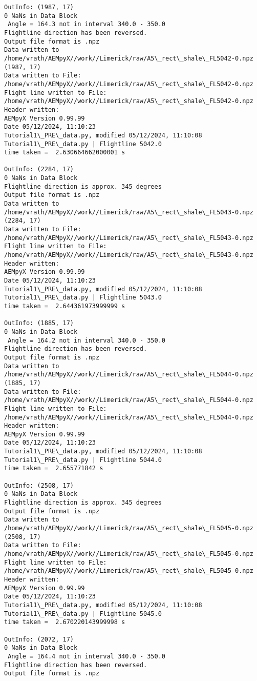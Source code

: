 \documentclass[11pt]{article}
\begin{document}
\begin{Verbatim}[commandchars=\\\{\}]
OutInfo: (1987, 17)
0 NaNs in Data Block
 Angle = 164.3 not in interval 340.0 - 350.0
Flightline direction has been reversed.
Output file format is .npz
Data written to
/home/vrath/AEMpyX//work//Limerick/raw/A5\_rect\_shale\_FL5042-0.npz
(1987, 17)
Data written to File:
/home/vrath/AEMpyX//work//Limerick/raw/A5\_rect\_shale\_FL5042-0.npz
Flight line written to File:
/home/vrath/AEMpyX//work//Limerick/raw/A5\_rect\_shale\_FL5042-0.npz
Header written:
AEMpyX Version 0.99.99
Date 05/12/2024, 11:10:23
Tutorial1\_PRE\_data.py, modified 05/12/2024, 11:10:08
Tutorial1\_PRE\_data.py | Flightline 5042.0
time taken =  2.630664662000001 s

OutInfo: (2284, 17)
0 NaNs in Data Block
Flightline direction is approx. 345 degrees
Output file format is .npz
Data written to
/home/vrath/AEMpyX//work//Limerick/raw/A5\_rect\_shale\_FL5043-0.npz
(2284, 17)
Data written to File:
/home/vrath/AEMpyX//work//Limerick/raw/A5\_rect\_shale\_FL5043-0.npz
Flight line written to File:
/home/vrath/AEMpyX//work//Limerick/raw/A5\_rect\_shale\_FL5043-0.npz
Header written:
AEMpyX Version 0.99.99
Date 05/12/2024, 11:10:23
Tutorial1\_PRE\_data.py, modified 05/12/2024, 11:10:08
Tutorial1\_PRE\_data.py | Flightline 5043.0
time taken =  2.644361973999999 s

OutInfo: (1885, 17)
0 NaNs in Data Block
 Angle = 164.2 not in interval 340.0 - 350.0
Flightline direction has been reversed.
Output file format is .npz
Data written to
/home/vrath/AEMpyX//work//Limerick/raw/A5\_rect\_shale\_FL5044-0.npz
(1885, 17)
Data written to File:
/home/vrath/AEMpyX//work//Limerick/raw/A5\_rect\_shale\_FL5044-0.npz
Flight line written to File:
/home/vrath/AEMpyX//work//Limerick/raw/A5\_rect\_shale\_FL5044-0.npz
Header written:
AEMpyX Version 0.99.99
Date 05/12/2024, 11:10:23
Tutorial1\_PRE\_data.py, modified 05/12/2024, 11:10:08
Tutorial1\_PRE\_data.py | Flightline 5044.0
time taken =  2.655771842 s

OutInfo: (2508, 17)
0 NaNs in Data Block
Flightline direction is approx. 345 degrees
Output file format is .npz
Data written to
/home/vrath/AEMpyX//work//Limerick/raw/A5\_rect\_shale\_FL5045-0.npz
(2508, 17)
Data written to File:
/home/vrath/AEMpyX//work//Limerick/raw/A5\_rect\_shale\_FL5045-0.npz
Flight line written to File:
/home/vrath/AEMpyX//work//Limerick/raw/A5\_rect\_shale\_FL5045-0.npz
Header written:
AEMpyX Version 0.99.99
Date 05/12/2024, 11:10:23
Tutorial1\_PRE\_data.py, modified 05/12/2024, 11:10:08
Tutorial1\_PRE\_data.py | Flightline 5045.0
time taken =  2.670220143999998 s

OutInfo: (2072, 17)
0 NaNs in Data Block
 Angle = 164.4 not in interval 340.0 - 350.0
Flightline direction has been reversed.
Output file format is .npz
    \end{Verbatim}
\end{document}
